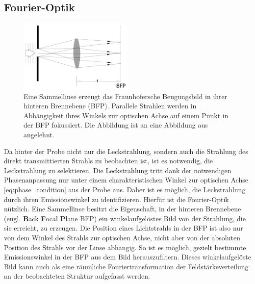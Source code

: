 \documentclass[a4paper, titlepage,  ngerman, fullpage]{book}
\begin{document}
	\subsection{Fourier-Optik}
	\label{sec:fourier}
	\begin{figure} 
		\centering
		\includegraphics[width=0.5\textwidth]{figures/FourierLinse.pdf}
		\caption[Fourieroptik]{Eine Sammellinse erzeugt das Fraunhofersche Beugungsbild in ihrer hinteren Brennebene (BFP). Parallele Strahlen werden in Abhängigkeit ihres Winkels zur optischen Achse auf einem Punkt in der BFP fokussiert. Die Abbildung ist an eine Abbildung aus \cite{Hecht.2018} angelehnt.}
		\label{fig:FourierLinse}
	\end{figure}
	Da hinter der Probe nicht nur die Leckstrahlung, sondern auch die Strahlung des direkt transmittierten Strahls zu beobachten ist, ist es notwendig, die Leckstrahlung zu selektieren. Die Leckstrahlung tritt dank der notwendigen Phasenanpassung nur unter einem charakteristischen Winkel zur optischen Achse \eqref{eq:phase_condition} aus der Probe aus. Daher ist es möglich, die Leckstrahlung durch ihren Emissionswinkel zu identifizieren. Hierfür ist die Fourier-Optik nützlich. Eine Sammellinse besitzt die Eigenschaft, in  der hinteren Brennebene (engl. \textbf{B}ack \textbf{F}ocal \textbf{P}lane BFP) ein winkelaufgelöstes Bild von der Strahlung, die sie erreicht, zu erzeugen\cite{Hecht.1996}. Die Position eines Lichtstrahls in der BFP ist also nur von dem Winkel des Strahls zur optischen Achse, nicht aber von der absoluten Position des Strahls vor der Linse abhängig. So ist es möglich, gezielt bestimmte Emissionswinkel in der BFP aus dem Bild herauszufiltern. Dieses winkelaufgelöste Bild kann auch als eine räumliche Fouriertransformation der Feldstärkeverteilung an der beobachteten Struktur aufgefasst werden. 
	
\end{document}
